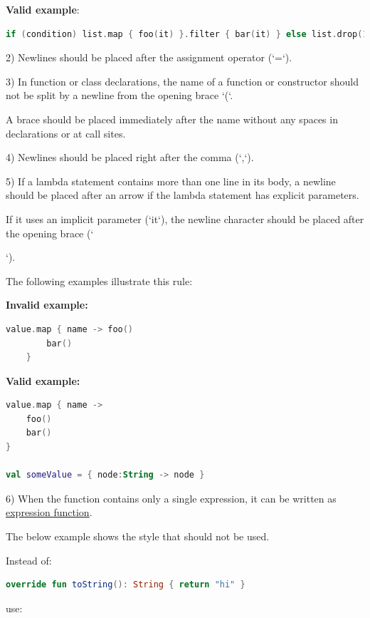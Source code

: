 {\textbf{Valid example}:  

\begin{lstlisting}[language=Kotlin]
if (condition) list.map { foo(it) }.filter { bar(it) } else list.drop(1)
\end{lstlisting}
  

2)	Newlines should be placed after the assignment operator (`=`).

3)	In function or class declarations, the name of a function or constructor should not be split by a newline from the opening brace `(`.

    A brace should be placed immediately after the name without any spaces in declarations or at call sites.

4)	Newlines should be placed right after the comma (`,`).

5)	If a lambda statement contains more than one line in its body, a newline should be placed after an arrow if the lambda statement has explicit parameters.

    If it uses an implicit parameter (`it`), the newline character should be placed after the opening brace (`{`). 

    The following examples illustrate this rule:





\textbf{Invalid example:}

\begin{lstlisting}[language=Kotlin]
    value.map { name -> foo()
        bar()
    }
\end{lstlisting}


\textbf{Valid example:} 

\begin{lstlisting}[language=Kotlin]
value.map { name ->
    foo()
    bar()
}

val someValue = { node:String -> node }
\end{lstlisting}


6) When the function contains only a single expression, it can be written as \href{https://kotlinlang.org/docs/reference/functions.html#single-expression-functions}{expression function}. 

   The below example shows the style that should not be used.

   

Instead of: 

\begin{lstlisting}[language=Kotlin]
override fun toString(): String { return "hi" }
\end{lstlisting}
use:

}}
